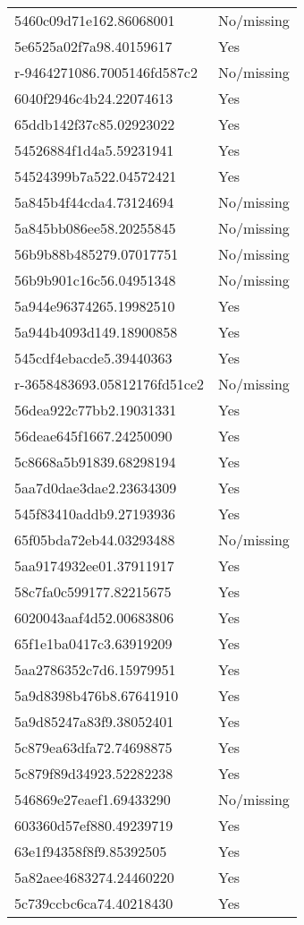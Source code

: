\begin{tabular}{ll}
5460c09d71e162.86068001 & No/missing \\
5e6525a02f7a98.40159617 & Yes \\
r-9464271086.7005146fd587c2 & No/missing \\
6040f2946c4b24.22074613 & Yes \\
65ddb142f37c85.02923022 & Yes \\
54526884f1d4a5.59231941 & Yes \\
54524399b7a522.04572421 & Yes \\
5a845b4f44cda4.73124694 & No/missing \\
5a845bb086ee58.20255845 & No/missing \\
56b9b88b485279.07017751 & No/missing \\
56b9b901c16c56.04951348 & No/missing \\
5a944e96374265.19982510 & Yes \\
5a944b4093d149.18900858 & Yes \\
545cdf4ebacde5.39440363 & Yes \\
r-3658483693.05812176fd51ce2 & No/missing \\
56dea922c77bb2.19031331 & Yes \\
56deae645f1667.24250090 & Yes \\
5c8668a5b91839.68298194 & Yes \\
5aa7d0dae3dae2.23634309 & Yes \\
545f83410addb9.27193936 & Yes \\
65f05bda72eb44.03293488 & No/missing \\
5aa9174932ee01.37911917 & Yes \\
58c7fa0c599177.82215675 & Yes \\
6020043aaf4d52.00683806 & Yes \\
65f1e1ba0417c3.63919209 & Yes \\
5aa2786352c7d6.15979951 & Yes \\
5a9d8398b476b8.67641910 & Yes \\
5a9d85247a83f9.38052401 & Yes \\
5c879ea63dfa72.74698875 & Yes \\
5c879f89d34923.52282238 & Yes \\
546869e27eaef1.69433290 & No/missing \\
603360d57ef880.49239719 & Yes \\
63e1f94358f8f9.85392505 & Yes \\
5a82aee4683274.24460220 & Yes \\
5c739ccbc6ca74.40218430 & Yes \\

\end{tabular}
